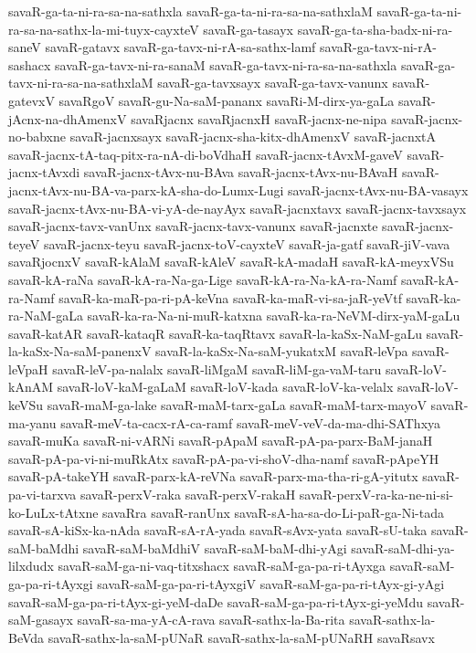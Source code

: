{savaR-ga-ta-ni-ra-sa-na-sathxla
savaR-ga-ta-ni-ra-sa-na-sathxlaM
savaR-ga-ta-ni-ra-sa-na-sathx-la-mi-tuyx-cayxteV
savaR-ga-tasayx
savaR-ga-ta-sha-badx-ni-ra-saneV
savaR-gatavx
savaR-ga-tavx-ni-rA-sa-sathx-lamf
savaR-ga-tavx-ni-rA-sashacx
savaR-ga-tavx-ni-ra-sanaM
savaR-ga-tavx-ni-ra-sa-na-sathxla
savaR-ga-tavx-ni-ra-sa-na-sathxlaM
savaR-ga-tavxsayx
savaR-ga-tavx-vanunx
savaR-gatevxV
savaRgoV
savaR-gu-Na-saM-pananx
savaRi-M-dirx-ya-gaLa
savaR-jAcnx-na-dhAmenxV
savaRjacnx
savaRjacnxH
savaR-jacnx-ne-nipa
savaR-jacnx-no-babxne
savaR-jacnxsayx
savaR-jacnx-sha-kitx-dhAmenxV
savaR-jacnxtA
savaR-jacnx-tA-taq-pitx-ra-nA-di-boVdhaH
savaR-jacnx-tAvxM-gaveV
savaR-jacnx-tAvxdi
savaR-jacnx-tAvx-nu-BAva
savaR-jacnx-tAvx-nu-BAvaH
savaR-jacnx-tAvx-nu-BA-va-parx-kA-sha-do-Lumx-Lugi
savaR-jacnx-tAvx-nu-BA-vasayx
savaR-jacnx-tAvx-nu-BA-vi-yA-de-nayAyx
savaR-jacnxtavx
savaR-jacnx-tavxsayx
savaR-jacnx-tavx-vanUnx
savaR-jacnx-tavx-vanunx
savaR-jacnxte
savaR-jacnx-teyeV
savaR-jacnx-teyu
savaR-jacnx-toV-cayxteV
savaR-ja-gatf
savaR-jiV-vava
savaRjocnxV
savaR-kAlaM
savaR-kAleV
savaR-kA-madaH
savaR-kA-meyxVSu
savaR-kA-raNa
savaR-kA-ra-Na-ga-Lige
savaR-kA-ra-Na-kA-ra-Namf
savaR-kA-ra-Namf
savaR-ka-maR-pa-ri-pA-keVna
savaR-ka-maR-vi-sa-jaR-yeVtf
savaR-ka-ra-NaM-gaLa
savaR-ka-ra-Na-ni-muR-katxna
savaR-ka-ra-NeVM-dirx-yaM-gaLu
savaR-katAR
savaR-kataqR
savaR-ka-taqRtavx
savaR-la-kaSx-NaM-gaLu
savaR-la-kaSx-Na-saM-panenxV
savaR-la-kaSx-Na-saM-yukatxM
savaR-leVpa
savaR-leVpaH
savaR-leV-pa-nalalx
savaR-liMgaM
savaR-liM-ga-vaM-taru
savaR-loV-kAnAM
savaR-loV-kaM-gaLaM
savaR-loV-kada
savaR-loV-ka-velalx
savaR-loV-keVSu
savaR-maM-ga-lake
savaR-maM-tarx-gaLa
savaR-maM-tarx-mayoV
savaR-ma-yanu
savaR-meV-ta-cacx-rA-ca-ramf
savaR-meV-veV-da-ma-dhi-SAThxya
savaR-muKa
savaR-ni-vARNi
savaR-pApaM
savaR-pA-pa-parx-BaM-janaH
savaR-pA-pa-vi-ni-muRkAtx
savaR-pA-pa-vi-shoV-dha-namf
savaR-pApeYH
savaR-pA-takeYH
savaR-parx-kA-reVNa
savaR-parx-ma-tha-ri-gA-yitutx
savaR-pa-vi-tarxva
savaR-perxV-raka
savaR-perxV-rakaH
savaR-perxV-ra-ka-ne-ni-si-ko-LuLx-tAtxne
savaRra
savaR-ranUnx
savaR-sA-ha-sa-do-Li-paR-ga-Ni-tada
savaR-sA-kiSx-ka-nAda
savaR-sA-rA-yada
savaR-sAvx-yata
savaR-sU-taka
savaR-saM-baMdhi
savaR-saM-baMdhiV
savaR-saM-baM-dhi-yAgi
savaR-saM-dhi-ya-lilxdudx
savaR-saM-ga-ni-vaq-titxshacx
savaR-saM-ga-pa-ri-tAyxga
savaR-saM-ga-pa-ri-tAyxgi
savaR-saM-ga-pa-ri-tAyxgiV
savaR-saM-ga-pa-ri-tAyx-gi-yAgi
savaR-saM-ga-pa-ri-tAyx-gi-yeM-daDe
savaR-saM-ga-pa-ri-tAyx-gi-yeMdu
savaR-saM-gasayx
savaR-sa-ma-yA-cA-rava
savaR-sathx-la-Ba-rita
savaR-sathx-la-BeVda
savaR-sathx-la-saM-pUNaR
savaR-sathx-la-saM-pUNaRH
savaRsavx
}
